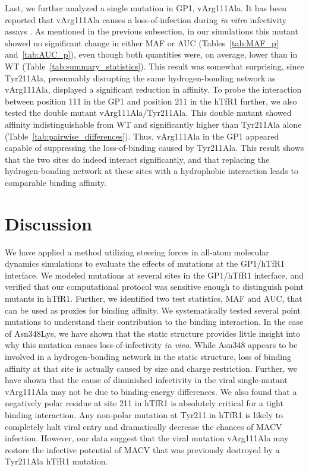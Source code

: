 \documentclass[12pt]{article}
\begin{document}
Last, we further analyzed a single mutation in GP1, vArg111Ala. It has been reported that vArg111Ala causes a loss-of-infection during \textit{in vitro} infectivity assays \citep{Rad20112}. As mentioned in the previous subsection, in our simulations this mutant showed no significant change in either MAF or AUC (Tables~\ref{tab:MAF_p} and~\ref{tab:AUC_p}), even though both quantities were, on average, lower than in WT (Table~\ref{tab:summary_statistics}). This result was somewhat surprising, since Tyr211Ala, presumably disrupting the same hydrogen-bonding network as vArg111Ala, displayed a significant reduction in affinity. To probe the interaction between position 111 in the GP1 and position 211 in the hTfR1 further, we also tested the double mutant vArg111Ala/Tyr211Ala. This double mutant showed affinity indistinguishable from WT and significantly higher than Tyr211Ala alone  (Table~\ref{tab:pairwise_differences}). Thus, vArg111Ala in the GP1 appeared capable of suppressing the loss-of-binding caused by Tyr211Ala. This result shows that the two sites do indeed interact significantly, and that replacing the hydrogen-bonding network at these sites with a hydrophobic interaction leads to comparable binding affinity.

\section*{Discussion}
We have applied a method utilizing steering forces in all-atom molecular dynamics simulations to evaluate the effects of mutations at the GP1/hTfR1 interface. We modeled mutations at several sites in the GP1/hTfR1 interface, and verified that our computational protocol was sensitive enough to distinguish point mutants in hTfR1. Further, we identified two test statistics, MAF and AUC, that can be used as proxies for binding affinity. We systematically tested several point mutations to understand their contribution to the binding interaction. In the case of Asn348Lys, we have shown that the static structure provides little insight into why this mutation causes loss-of-infectivity \textit{in vivo}. While Asn348 appears to be involved in a hydrogen-bonding network in the static structure, loss of binding affinity at that site is actually caused by size and charge restriction. Further, we have shown that the cause of diminished infectivity in the viral single-mutant vArg111Ala may not be due to binding-energy differences. We also found that a negatively polar residue at site 211 in hTfR1 is absolutely critical for a tight binding interaction. Any non-polar mutation at Tyr211 in hTfR1 is likely to completely halt viral entry and dramatically decrease the chances of MACV infection. However, our data suggest that the viral mutation vArg111Ala may restore the infective potential of MACV that was previously destroyed by a Tyr211Ala hTfR1 mutation.
\end{document}
